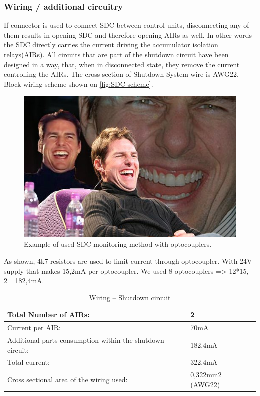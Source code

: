 \subsubsection{Wiring / additional circuitry}

If connector is used to connect SDC between control units, disconnecting any of them results in opening SDC and therefore opening AIRs as well. In other words the SDC directly carries the current driving the accumulator isolation relays(AIRs). All circuits that are part of the shutdown circuit have been designed in a way, that, when in disconnected state, they remove the current controlling the AIRs.
The cross-section of Shutdown System wire is AWG22. Block wiring scheme shown on \ref{fig:SDC-scheme}.\\

\begin{figure}[H]
	\centering
	\includegraphics[width=\textwidth]{./img/sdc-schematic.jpg}
	\caption{Example of used SDC monitoring method with optocouplers.}
	\label{fig:SDC-schematic}
\end{figure}

As shown, 4k7 resistors are used to limit current through optocoupler. With 24V supply that makes 15,2mA per optocoupler. We used 8 optocouplers => 12*15, 2= 182,4mA.
\begin{table}[H]
	\centering
	\caption{Wiring – Shutdown circuit}
	\begin{tabularx}{\textwidth}{|X|X|}
		\hline
		Total Number of AIRs: & 2 \\[\TableSize]
		\hline
		Current per AIR: & 70mA \\[\TableSize]
		\hline
		Additional parts consumption within the shutdown circuit: & 182,4mA \\[\TableSize]
		\hline
		Total current: & 322,4mA \\[\TableSize]
		\hline
		Cross sectional area of the wiring used: & 0,322mm2 (AWG22) \\[\TableSize]
		\hline
	\end{tabularx}%
	\label{tab:SDC-Wiring}%
\end{table}%


